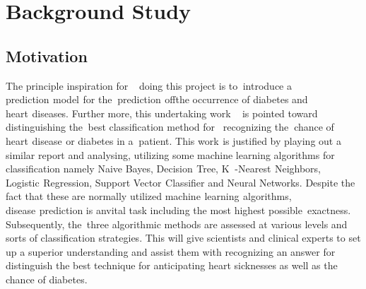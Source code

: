\documentclass[oneside,12pt]{Classes/VTU}
\begin{document}
    \section{Background Study}
    \subsection{Motivation}

    The principle inspiration for\tiny\textcolor{white}{un}\normalsize doing this project is to\tiny\textcolor{white}{o}\normalsize introduce a prediction\tiny\textcolor{white}{s}\normalsize model\tiny\textcolor{white}{s}\normalsize for the\tiny\textcolor{white}{n}\normalsize prediction\tiny\textcolor{white}{s}\normalsize of\tiny\textcolor{white}{f}\normalsize the occurrence of diabetes and heart\tiny\textcolor{white}{s}\normalsize diseases. Further more, this undertaking work \tiny\textcolor{white}{m}\normalsize is pointed toward distinguishing the\tiny\textcolor{white}{n}\normalsize best classification method for\tiny\textcolor{white}{m}\normalsize recognizing the\tiny\textcolor{white}{n}\normalsize chance of heart\tiny\textcolor{white}{s}\normalsize disease\tiny\textcolor{white}{s}\normalsize or diabetes in a\tiny\textcolor{white}{n}\normalsize patient. This work\tiny\textcolor{white}{s}\normalsize is justified by playing out a similar report and analysing, utilizing some machine learning algorithms for classification namely Naive Bayes, Decision\tiny\textcolor{white}{s}\normalsize Tree, K\tiny\textcolor{white}{n}\normalsize-Nearest\tiny\textcolor{white}{s}\normalsize Neighbors, Logistic\tiny\textcolor{white}{s}\normalsize Regression, Support Vector\tiny\textcolor{white}{s}\normalsize Classifier and Neural Networks. Despite the fact that these are normally utilized machine\tiny\textcolor{white}{s}\normalsize learning\tiny\textcolor{white}{s}\normalsize algorithms, disease\tiny\textcolor{white}{s}\normalsize prediction is anvital task including the most highest possible\tiny\textcolor{white}{y}\normalsize exactness. Subsequently, the\tiny\textcolor{white}{n}\normalsize three algorithmic methods are assessed at various levels and sorts of classification strategies. This will give scientists and clinical experts to set up a superior understanding and assist them with recognizing an answer for distinguish the best technique for anticipating heart sicknesses as well as the chance of diabetes.
\end{document}
